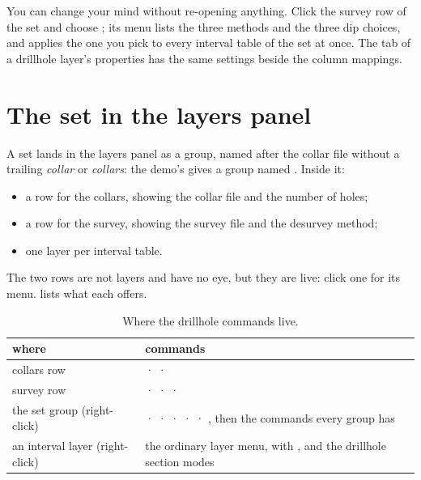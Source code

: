 \begin{tip}
You can change your mind without re-opening anything. Click the  survey row of the set and choose ; its menu lists the three methods and the three dip choices, and applies the one you pick to every interval table of the set at once. The  tab of a drillhole layer's properties has the same settings beside the column mappings.
\end{tip}

\section{The set in the layers panel}\label{sec:dh-set}


A set lands in the layers panel as a group, named after the collar file without a trailing \emph{collar} or \emph{collars}: the demo's  gives a group named . Inside it:

\begin{itemize}
\item a  row for the collars, showing the collar file and the number of holes;
\item a  row for the survey, showing the survey file and the desurvey method;
\item one layer per interval table.
\end{itemize}

The two rows are not layers and have no eye, but they are live: click one for its menu.  lists what each offers.

\begin{table}[htbp]
\small
\begin{tabularx}{\linewidth}{@{}lL@{}}\toprule
where & commands \\ \midrule
{} collars row &  ·  ·  \\
 survey row &  ·  ·  ·  \\
the set group (right-click) &  ·  ·  ·  ·  · , then the commands every group has \\
an interval layer (right-click) & the ordinary layer menu, with ,  and the drillhole section modes \\
\bottomrule
\end{tabularx}
\caption{Where the drillhole commands live.}\label{tab:dh-menus}
\end{table}

